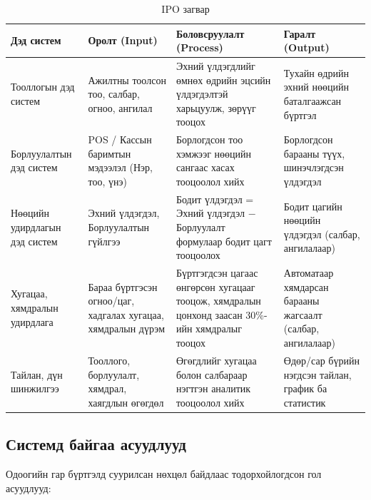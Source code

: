 \begin{table}
    \centering
    \begin{tabular}{p{2.8cm}p{3.6cm}p{4.2cm}p{3.4cm}}
        \toprule
        \textbf{Дэд систем} &
        \textbf{Оролт (Input)} &
        \textbf{Боловсруулалт (Process)} &
        \textbf{Гаралт (Output)} \\
        \midrule
        Тооллогын дэд систем &
        Ажилтны тоолсон тоо, салбар, огноо, ангилал &
        Эхний үлдэгдлийг өмнөх өдрийн эцсийн үлдэгдэлтэй харьцуулж, зөрүүг тооцох &
        Тухайн өдрийн эхний нөөцийн баталгаажсан бүртгэл \\

        Борлуулалтын дэд систем &
        POS / Кассын баримтын мэдээлэл (Нэр, тоо, үнэ) &
        Борлогдсон тоо хэмжээг нөөцийн сангаас хасах тооцоолол хийх &
        Борлогдсон барааны түүх, шинэчлэгдсэн үлдэгдэл \\

        Нөөцийн удирдлагын дэд систем &
        Эхний үлдэгдэл, Борлуулалтын гүйлгээ &
        Бодит үлдэгдэл = Эхний үлдэгдэл $-$ Борлуулалт формулаар бодит цагт тооцоолох &
        Бодит цагийн нөөцийн үлдэгдэл (салбар, ангилалаар) \\

        Хугацаа, хямдралын удирдлага &
        Бараа бүртгэсэн огноо/цаг, хадгалах хугацаа, хямдралын дүрэм &
        Бүртгэгдсэн цагаас өнгөрсөн хугацааг тооцож, хямдралын цонхонд заасан 30\%-ийн хямдралыг тооцох &
        Автоматаар хямдарсан барааны жагсаалт (салбар, ангилалаар) \\

        Тайлан, дүн шинжилгээ &
        Тооллого, борлуулалт, хямдрал, хаягдлын өгөгдөл &
        Өгөгдлийг хугацаа болон салбараар нэгтгэн аналитик тооцоолол хийх &
        Өдөр/сар бүрийн нэгдсэн тайлан, график ба статистик \\
        \bottomrule
    \end{tabular}
    \caption{IPO загвар}
    \label{tab:ipo}
\end{table}

\subsection{Системд байгаа асуудлууд}
Одоогийн гар бүртгэлд суурилсан нөхцөл байдлаас тодорхойлогдсон гол асуудлууд:

